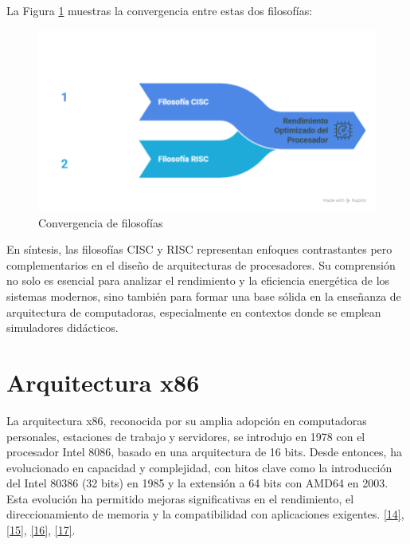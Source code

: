 \documentclass[12pt,oneside]{templates/unerthesis}
\begin{document}
La Figura \ref{fig:convergen} muestras la convergencia entre estas dos filosofías:

\begin{figure}

{\centering \includegraphics[width=1\linewidth]{images/convergen} 

}

\caption{Convergencia de filosofías}\label{fig:convergen}
\end{figure}

En síntesis, las filosofías CISC y RISC representan enfoques contrastantes pero complementarios en el diseño de arquitecturas de procesadores. Su comprensión no solo es esencial para analizar el rendimiento y la eficiencia energética de los sistemas modernos, sino también para formar una base sólida en la enseñanza de arquitectura de computadoras, especialmente en contextos donde se emplean simuladores didácticos.

\hypertarget{arquitectura-x86-1}{%
\section{Arquitectura x86}\label{arquitectura-x86-1}}

La arquitectura x86, reconocida por su amplia adopción en computadoras personales, estaciones de trabajo y servidores, se introdujo en 1978 con el procesador Intel 8086, basado en una arquitectura de 16 bits. Desde entonces, ha evolucionado en capacidad y complejidad, con hitos clave como la introducción del Intel 80386 (32 bits) en 1985 y la extensión a 64 bits con AMD64 en 2003. Esta evolución ha permitido mejoras significativas en el rendimiento, el direccionamiento de memoria y la compatibilidad con aplicaciones exigentes. \protect\hyperlink{ref-stallings_computer_2021}{{[}14{]}}, \protect\hyperlink{ref-intel_64_2016}{{[}15{]}}, \protect\hyperlink{ref-amd_developer_2019}{{[}16{]}}, \protect\hyperlink{ref-abel_ibm_2000}{{[}17{]}}.
\end{document}
